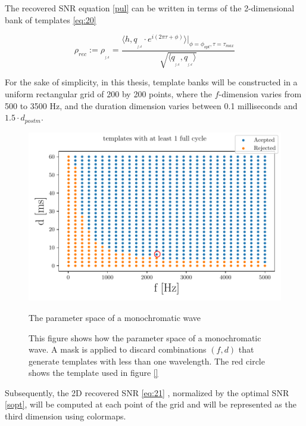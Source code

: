 The recovered SNR equation \ref{pul} can be written in terms of the 2-dimensional bank of templates \ref{eq:20}

\begin{equation}\label{eq:21}
\rho_{rec} := \rho_{_{_{f,d}}} = \frac{\langle h, q_{_{_{f,d}}}\cdot e^{i(2\pi \tau+\phi)}\rangle \bigg\rvert_{\phi =\phi_{opt},\tau =\tau_{max}}}{\sqrt{\langle  q_{_{_{f,d}}},q_{_{_{f,d}}} \rangle}}
\end{equation}


For the sake of simplicity, in this thesis, template banks will be constructed in a uniform rectangular grid of 200 by 200 points, where the $f$-dimension varies from 500 to 3500 Hz, and the duration dimension varies between 0.1 milliseconds and $1.5 \cdot d_{postm}$. 

\begin{figure}[!htb]
\centering
\includegraphics[scale=0.5]{images/Data_analysis/results/param_space.pdf}
\captionsetup{width=0.8\textwidth}
\caption{The parameter space of a monochromatic wave}
\caption*{This figure shows how the parameter space of a monochromatic wave. A mask is applied to discard combinations $(f,d)$ that generate templates with less than one wavelength. The red circle shows the template used in figure \ref{}}
\end{figure}
\FloatBarrier


Subsequently, the 2D recovered SNR \ref{eq:21} , normalized by the optimal SNR \ref{sopt}, will be computed at each point of the grid and will be represented as the third dimension using colormaps. 


